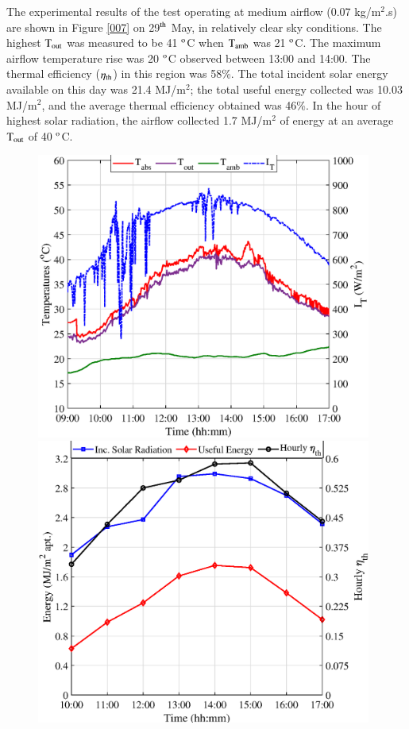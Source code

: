 The experimental results of the test operating at medium airflow (0.07 kg/m$^2$.s) are shown in Figure \ref{007} on 29$^{\rm{th}}$ May, in relatively clear sky conditions. The highest $\rm{T_{out}}$ was measured to be 41 $^{\rm{o}}$C  when $\rm{T_{amb}}$ was 21 $^{\rm{o}}$C. The maximum airflow temperature rise was 20 $^{\rm{o}}$C observed between 13:00 and 14:00. The thermal efficiency ($\eta_{\rm{th}}$) in this region was 58\%. The total incident solar energy available on this day was 21.4 MJ/m$^2$; the total useful energy collected was 10.03 MJ/m$^2$, and the average thermal efficiency obtained was 46\%. In the hour of highest solar radiation, the airflow collected 1.7 MJ/m$^2$ of energy at an average $\rm{T_{out}}$ of 40 $^{\rm{o}}$C.


\begin{figure}[!ht]
	\centering
	\begin{minipage}{0.49\textwidth}
		\centering
		\includegraphics[width=0.98\textwidth]{figs/007-1.eps} %
	\end{minipage}\hfill
	\begin{minipage}{0.49\textwidth}
		\centering
		\includegraphics[width=0.98\textwidth]{figs/007-2.eps} %

\end{minipage}
\end{figure}
